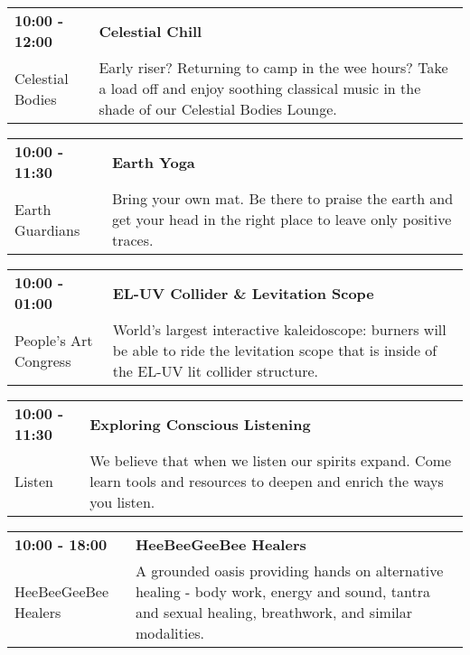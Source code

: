 \begin{tabular}{ p{1in} p{2.2in} }
    \textbf{10:00 - 12:00} & \textbf{Celestial Chill} \\
    Celestial Bodies \newline  & Early riser? Returning to camp in the wee hours? Take a load off and enjoy soothing classical music in the shade of our Celestial Bodies Lounge. \\
    \hline 
\end{tabular}
    
\begin{tabular}{ p{1in} p{2.2in} }
    \textbf{10:00 - 11:30} & \textbf{Earth Yoga} \\
    Earth Guardians \newline  & Bring your own mat. Be there to praise the earth and get your head in the right place to leave only positive traces. \\
    \hline 
\end{tabular}
    
\begin{tabular}{ p{1in} p{2.2in} }
    \textbf{10:00 - 01:00} & \textbf{EL-UV Collider \& Levitation Scope} \\
    People's Art Congress \newline  & World's largest interactive kaleidoscope: burners will be able to ride the levitation scope that is inside of the EL-UV lit collider structure. \\
    \hline 
\end{tabular}
    
\begin{tabular}{ p{1in} p{2.2in} }
    \textbf{10:00 - 11:30} & \textbf{Exploring Conscious Listening} \\
    Listen \newline  & We believe that when we listen our spirits expand. Come learn tools and resources to deepen and enrich the ways you listen. \\
    \hline 
\end{tabular}
    
\begin{tabular}{ p{1in} p{2.2in} }
    \textbf{10:00 - 18:00} & \textbf{HeeBeeGeeBee Healers} \\
    HeeBeeGeeBee Healers \newline  & A grounded oasis providing hands on alternative healing - body work, energy and sound, tantra and sexual healing, breathwork, and similar modalities. \\
    \hline 
\end{tabular}
    
